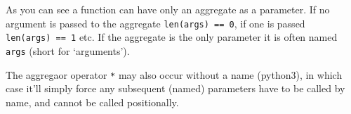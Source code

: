 \begin{frame}[fragile]

\begin{Shaded}
\begin{Highlighting}[]
 
    \NormalTok{(}
\end{Highlighting}
\end{Shaded}

As you can see a function can have only an aggregate as a parameter. If
no argument is passed to the aggregate \texttt{len(args)\ ==\ 0}, if one
is passed \texttt{len(args)\ ==\ 1} etc. If the aggregate is the only
parameter it is often named \texttt{args} (short for `arguments').

\end{frame}

\begin{frame}[fragile]

The aggregaor operator \texttt{*} may also occur without a name
(python3), in which case it'll simply force any subsequent (named)
parameters have to be called by name, and cannot be called positionally.

\begin{Shaded}
\begin{Highlighting}[]
 \NormalTok{):}
\end{Highlighting}
\end{Shaded}

\end{frame}

